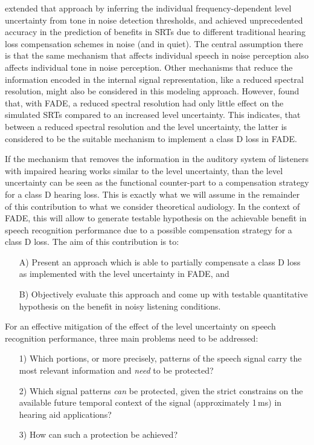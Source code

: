 \documentclass[10pt,a4paper,twocolumn]{article}
\begin{document}
\cite{schaedler2020a} extended that approach by inferring the individual frequency-dependent level uncertainty from tone in noise detection thresholds, and achieved unprecedented accuracy in the prediction of benefits in SRTs due to different traditional hearing loss compensation schemes in noise (and in quiet).
%
The central assumption there is that the same mechanism that affects individual speech in noise perception also affects individual tone in noise perception.
%
Other mechanisms that reduce the information encoded in the internal signal representation, like a reduced spectral resolution, might also be considered in this modeling approach.
%
However, \cite{huelsmeier2020} found that, with FADE, a reduced spectral resolution had only little effect on the simulated SRTs compared to an increased level uncertainty.
%
This indicates, that between a reduced spectral resolution and the level uncertainty, the latter is considered to be the suitable mechanism to implement a class D loss in FADE.

If the mechanism that removes the information in the auditory system of listeners with impaired hearing works similar to the level uncertainty, than the level uncertainty can be seen as the functional counter-part to a compensation strategy for a class D hearing loss.
%
This is exactly what we will assume in the remainder of this contribution to what we consider theoretical audiology.
%
In the context of FADE, this will allow to generate testable hypothesis on the achievable benefit in speech recognition performance due to a possible compensation strategy for a class D loss.
%
The aim of this contribution is to:
\begin{itemize}
	\item[A)] Present an approach which is able to partially compensate a class D loss as implemented with the level uncertainty in FADE, and
	\item[B)] Objectively evaluate this approach and come up with testable quantitative hypothesis on the benefit in noisy listening conditions.
\end{itemize}

For an effective mitigation of the effect of the level uncertainty on speech recognition performance, three main problems need to be addressed:
\begin{itemize}
  \item[1)] Which portions, or more precisely, patterns of the speech signal carry the most relevant information and \emph{need} to be protected?
  \item[2)] Which signal patterns \emph{can} be protected, given the strict constrains on the available future temporal context of the signal (approximately 1\,ms) in hearing aid applications?
  \item[3)] How can such a protection be achieved?
\end{itemize}
\end{document}
